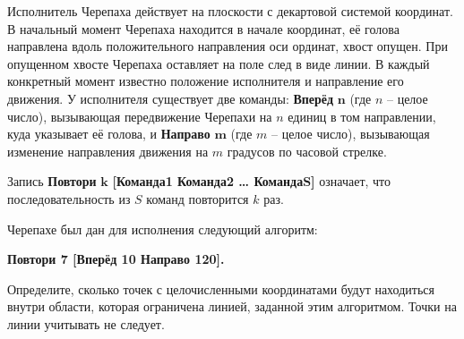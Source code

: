 \documentclass[14pt,a4paper]{article}
\begin{document}
Исполнитель Черепаха действует на плоскости с декартовой системой
координат. В начальный момент Черепаха находится в начале координат,
её голова направлена вдоль положительного направления оси ординат,
хвост опущен. При опущенном хвосте Черепаха оставляет на поле след в
виде линии. В каждый конкретный момент известно положение исполнителя
и направление его движения. У исполнителя существует две команды:
\textbf{Вперёд} $\bm{n}$ (где $n$ -- целое число), вызывающая
передвижение Черепахи на $n$ единиц в том направлении, куда указывает
её голова, и \textbf{Направо} $\bm{m}$ (где $m$ -- целое число),
вызывающая изменение направления движения на $m$ градусов по часовой
стрелке.

Запись \textbf{Повтори} $\bm{k}$ \textbf{[Команда1 Команда2 …
КомандаS]} означает, что последовательность из $S$ команд повторится
$k$ раз.

Черепахе был дан для исполнения следующий алгоритм:

\textbf{Повтори 7 [Вперёд 10 Направо 120].}

Определите, сколько точек с целочисленными координатами будут
находиться внутри области, которая ограничена линией, заданной этим
алгоритмом. Точки на линии учитывать не следует.
\end{document}
